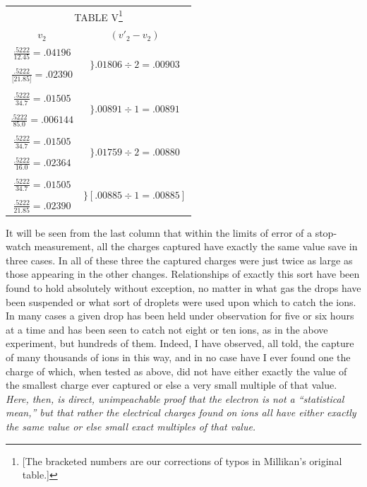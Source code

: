 \begin{table}[htp]
\centering
\begin{minipage}{\textwidth}
\centering
\begin{tabular}{ c c }
  \multicolumn{2}{c}{TABLE V\footnote{[The bracketed numbers are our corrections of typos
  in Millikan's original table.]}}\\[3pt]
  $v_2$ & $ (v'_2 - v_2)$\\[5pt]
  $\frac{.5222}{12.45} = .04196$ & \multirow{3}{*}{$\biggr\} .01806 \div 2 = .00903$}\\
  &\\
  $\frac{.5222}{{[}21.85{]}} = .02390$ & \multirow{3}{*}{$\biggr\} .00885 \div 1 = .00885$}\\
  &\\
  $\frac{.5222}{34.7} = .01505$ &\multirow{3}{*}{$\biggr\} .00891 \div 1 = .00891$}\\
  &\\
  $\frac{.5222}{85.0} = .006144$ &\multirow{3}{*}{$\biggr\} .00891 \div 1 = .00891$}\\
  &\\
  $\frac{.5222}{34.7} = .01505$ &\multirow{3}{*}{$\biggr\} .01759 \div 2 = .00880$}\\
  &\\
  $\frac{.5222}{16.0} = .02364$ &\multirow{3}{*}{$\biggr\} .01759 \div 2 = .00880$}\\
  &\\
  $\frac{.5222}{34.7} = .01505$ &\multirow{3}{*}{$\biggr\} [.00885 \div 1 = .00885]$}\\
  &\\
  $\frac{.5222}{21.85} = .02390$ &\\
\end{tabular}
\end{minipage}
\end{table}

It will be seen from the last column that within the limits of error of
a stop-watch measurement, all the charges captured have exactly the same
value save in three cases. In all of these three the captured charges
were just twice as large as those appearing in the other changes.
Relationships of exactly this sort have been found to hold absolutely
without exception, no matter in what gas the drops have been suspended
or what sort of droplets were used upon which to catch the ions. In many
cases a given drop has been held under observation for five or six hours
at a time and has been seen to catch not eight or ten ions, as in the
above experiment, but hundreds of them. Indeed, I have observed, all
told, the capture of many thousands of ions in this way, and in no case
have I ever found one the charge of which, when tested as above, did not
have either exactly the value of the smallest charge ever captured or
else a very small multiple of that value. \emph{Here, then, is direct,
unimpeachable proof that the electron is not a ``statistical mean,'' but
that rather the electrical charges found on ions all have either exactly
the same value or else small exact multiples of that value.}

